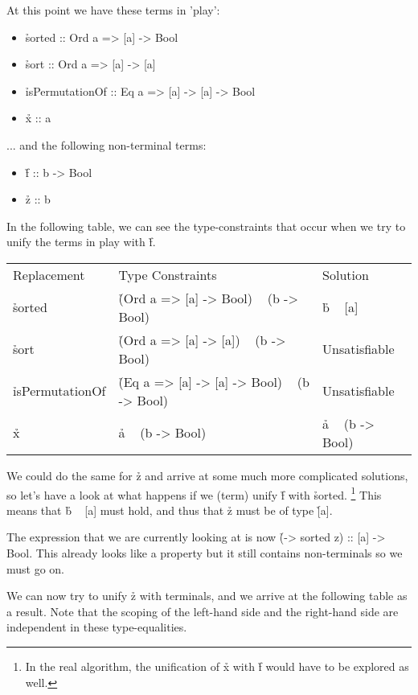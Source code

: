 \documentclass[a4paper, 11pt]{article}
\begin{document}
At this point we have these terms in 'play':

\begin{itemize}
  \item \h{sorted :: Ord a => [a] -> Bool}
  \item \h{sort :: Ord a => [a] -> [a]}
  \item \h{isPermutationOf :: Eq a => [a] -> [a] -> Bool}
  \item \h{x :: a}
\end{itemize}

... and the following non-terminal terms:

\begin{itemize}
  \item \h{f :: b -> Bool}
  \item \h{z :: b}
\end{itemize}

In the following table, we can see the type-constraints that occur when we try to unify the terms in play with \h{f}.

\begin{tabular}{lll}
  Replacement & Type Constraints & Solution \\
  \h{sorted} & \h{(Ord a => [a] -> Bool) ~ (b -> Bool)} & \h{b ~ [a]} \\
  \h{sort} & \h{(Ord a => [a] -> [a]) ~ (b -> Bool)} & Unsatisfiable \\
  \h{isPermutationOf} & \h{(Eq a => [a] -> [a] -> Bool) ~ (b -> Bool)} & Unsatisfiable \\
  \h{x} & \h{a ~ (b -> Bool)} & \h{a ~ (b -> Bool)} \\
\end{tabular}

We could do the same for \h{z} and arrive at some much more complicated solutions, so let's have a look at what happens if we (term) unify \h{f} with \h{sorted}. \footnote{In the real algorithm, the unification of \h{x} with \h{f} would have to be explored as well.}
This means that \h{b ~ [a]} must hold, and thus that \h{z} must be of type \h{[a]}.

The expression that we are currently looking at is now \h{(\a -> sorted z) :: [a] -> Bool}.
This already looks like a property but it still contains non-terminals so we must go on.

We can now try to unify \h{z} with terminals, and we arrive at the following table as a result.
Note that the scoping of the left-hand side and the right-hand side are independent in these type-equalities.
\end{document}
